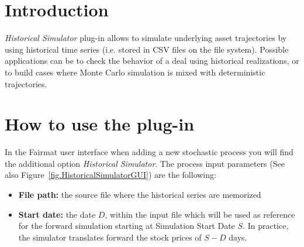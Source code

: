 \newcommand{\pluginName}{Historical Simulator}
\newcommand{\pluginVersion}{1.0.0}



\section{Introduction}
\emph{Historical Simulator} plug-in allows to simulate underlying asset trajectories by using historical time series (i.e. stored in CSV files on the file system).
Possible applications can be to check the behavior of a deal using historical realizations, or to build cases where Monte Carlo simulation is mixed with deterministic trajectories.

\section{How to use the plug-in}
In the Fairmat user interface when adding a new stochastic process
you will find the additional option \emph{Historical Simulator}.
The process input parameters (See also Figure~\ref{fig.HistoricalSimulatorGUI}) are the following:
\begin{itemize}
\item \textbf{File path:} the source file where the historical series are memorized
\item \textbf{Start date:} the date $D$, within the input file which will be used as reference for the forward simulation starting at Simulation Start Date $S$.  In practice, the simulator translates forward the stock prices of $S-D$ days.
\end{itemize}

